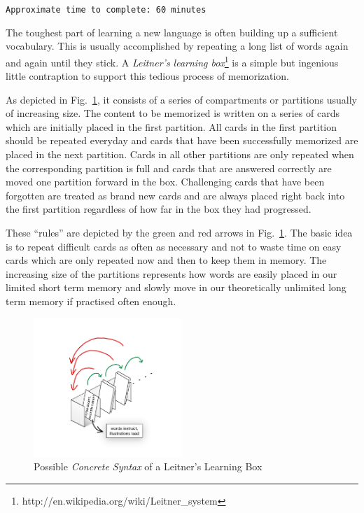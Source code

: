 \genHeader

{\scriptsize \texttt{Approximate time to complete: 60 minutes} }

The toughest part of learning a new language  is often building up a sufficient vocabulary. This is usually accomplished by repeating a long list of words again
and again until they stick. A \emph{Leitner's learning box}\footnote{http://en.wikipedia.org/wiki/Leitner\_system} is a simple but ingenious little contraption
to support this tedious process of memorization.

As depicted in Fig.~\ref{fig:membox_illustration}, it consists of a series of compartments or partitions usually of increasing size. The content to be memorized
is written on a series of cards  which are initially placed in the first partition. All cards in the first  partition should be repeated everyday and cards that
have been successfully memorized are placed in the next partition. Cards in all other partitions are only repeated when the corresponding partition is full and
cards that are  answered correctly are moved one partition forward in the box. Challenging  cards that have been forgotten are treated as brand new cards and
are always  placed right back into the first partition regardless of how far in the box they  had progressed.

These ``rules'' are depicted by the green and red arrows in  Fig.~\ref{fig:membox_illustration}. The basic idea is to repeat difficult cards as often as
necessary and not to waste time on easy cards which are only repeated now and then to keep them in memory. The increasing size of the partitions represents how
words are easily placed in our limited short term memory and slowly move in our theoretically unlimited long term memory if practised often enough.

 \begin{figure}[htp]
 \begin{center}
   \includegraphics[width=0.5\textwidth]{../membox_illustration}
   \caption[]{Possible \emph{Concrete Syntax} of a Leitner's Learning Box}
   \label{fig:membox_illustration}
 \end{center}
 \end{figure}
 \FloatBarrier


